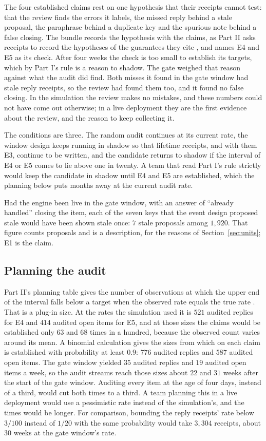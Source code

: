 \documentclass[11pt]{article}
\theoremstyle{definition}
\theoremstyle{plain}
\begin{document}
The four established claims rest on one hypothesis that their receipts cannot test: that the
review finds the errors it labels, the missed reply behind a stale proposal, the paraphrase behind
a duplicate key and the spurious note behind a false closing. The bundle records the hypothesis with
the claims, as Part II asks receipts to record the hypotheses of the guarantees they cite
\cite[Section~8.3]{part2}, and names E4 and E5 as its check. After four weeks the check is too small
to establish its targets, which by Part I's rule is a reason to shadow. The gate weighed that reason
against what the audit did find. Both misses it found in the gate window had stale reply receipts,
so the review had found them too, and it found no false closing. In the simulation the review makes
no mistakes, and these numbers could not have come out otherwise; in a live deployment they are the
first evidence about the review, and the reason to keep collecting it.

The conditions are three. The random audit continues at its current rate, the window design keeps
running in shadow so that lifetime receipts, and with them E3, continue to be written, and the
candidate returns to shadow if the interval of E4 or E5 comes to lie above one in twenty. A team
that read Part I's rule strictly would keep the candidate in shadow until E4 and E5 are established,
which the planning below puts months away at the current audit rate.

Had the engine been live in the gate window, with an answer of ``already handled'' closing the
item, each of the seven keys that the event design proposed stale would have been shown stale once:
$7$ stale proposals among $1{,}920$. That figure counts proposals and is a description, for the
reasons of Section~\ref{sec:units}; E1 is the claim.

\subsection{Planning the audit}\label{sec:planning}

Part II's planning table gives the number of observations at which the upper end of the interval
falls below a target when the observed rate equals the true rate \cite[Section~5.6]{part2}. That is a
plug-in size. At the rates the simulation used it is $521$ audited replies for E4 and $414$ audited
open items for E5, and at those sizes the claims would be established only $63$ and $68$ times in a
hundred, because the observed count varies around its mean. A binomial calculation gives the sizes
from which on each claim is established with probability at least $0.9$: $776$ audited replies and
$587$ audited open items. The gate window yielded $35$ audited replies and $19$ audited open items a
week, so the audit streams reach those sizes about $22$ and $31$ weeks after the start of the gate
window. Auditing every item at the age of four days, instead of a third, would cut both times to a
third. A team planning this in a live deployment would use a pessimistic rate instead of the
simulation's, and the times would be longer. For comparison, bounding the reply receipts' rate below
$3/100$ instead of $1/20$ with the same probability would take $3{,}304$ receipts, about $30$ weeks
at the gate window's rate.
\end{document}
